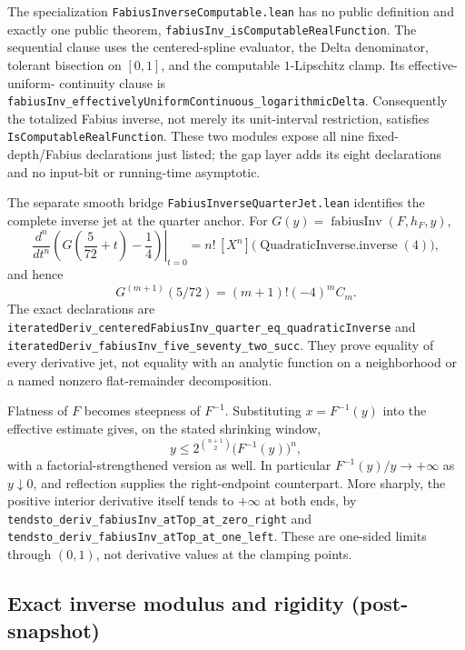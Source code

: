 \documentclass[11pt,oneside]{article}
\theoremstyle{definition}
\theoremstyle{remark}
\begin{document}
The specialization \nolinkurl{FabiusInverseComputable.lean} has no public
definition and exactly one public theorem,
\nolinkurl{fabiusInv_isComputableRealFunction}.  The sequential clause uses
the centered-spline evaluator, the Delta denominator, tolerant bisection on
\([0,1]\), and the computable \(1\)-Lipschitz clamp.  Its effective-uniform-
continuity clause is
\nolinkurl{fabiusInv_effectivelyUniformContinuous_logarithmicDelta}.
Consequently the totalized Fabius inverse, not merely its unit-interval restriction,
satisfies \nolinkurl{IsComputableRealFunction}.  These two modules expose all
nine fixed-depth/Fabius declarations just listed; the gap layer adds its eight
declarations and no input-bit or running-time asymptotic.

The separate smooth bridge \nolinkurl{FabiusInverseQuarterJet.lean} identifies
the complete inverse jet at the quarter anchor.  For
\(G(y)=\operatorname{fabiusInv}(F,h_F,y)\),
\[
 \left.\frac{d^n}{dt^n}
   \left(G\!\left(\frac5{72}+t\right)-\frac14\right)\right|_{t=0}
 =n!\,[X^n]\bigl(\operatorname{QuadraticInverse.inverse}(4)\bigr),
\]
and hence
\[
 G^{(m+1)}(5/72)=(m+1)!(-4)^m C_m.
\]
The exact declarations are
\nolinkurl{iteratedDeriv_centeredFabiusInv_quarter_eq_quadraticInverse} and
\nolinkurl{iteratedDeriv_fabiusInv_five_seventy_two_succ}.  They prove
equality of every derivative jet, not equality with an analytic function on
a neighborhood or a named nonzero flat-remainder decomposition.

Flatness of \(F\) becomes steepness of \(F^{-1}\).  Substituting
\(x=F^{-1}(y)\) into the effective estimate gives, on the stated shrinking
window,
\[
  y\leq 2^{\binom{n+1}{2}}\bigl(F^{-1}(y)\bigr)^n,
\]
with a factorial-strengthened version as well.  In particular
\(F^{-1}(y)/y\to+\infty\) as \(y\downarrow0\), and reflection supplies the
right-endpoint counterpart.
More sharply, the positive interior derivative itself tends to \(+\infty\)
at both ends, by
\nolinkurl{tendsto_deriv_fabiusInv_atTop_at_zero_right} and
\nolinkurl{tendsto_deriv_fabiusInv_atTop_at_one_left}.  These are one-sided
limits through \((0,1)\), not derivative values at the clamping points.

\subsection{Exact inverse modulus and rigidity (post-snapshot)}
\end{document}
